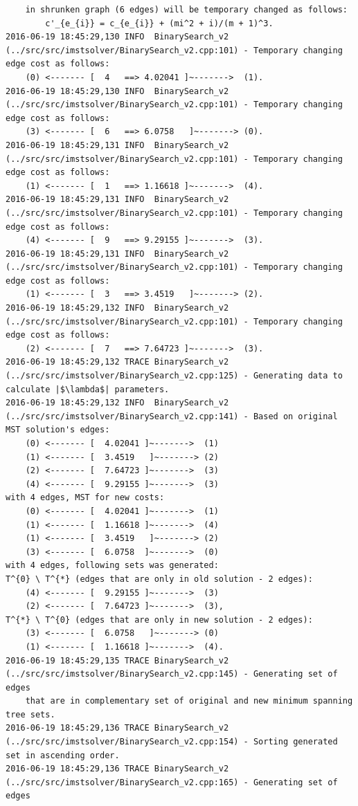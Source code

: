 \begin{verbatim}
	in shrunken graph (6 edges) will be temporary changed as follows:
		c'_{e_{i}} = c_{e_{i}} + (mi^2 + i)/(m + 1)^3.
2016-06-19 18:45:29,130 INFO  BinarySearch_v2 (../src/src/imstsolver/BinarySearch_v2.cpp:101) - Temporary changing edge cost as follows:
	(0)	<------- [	4	==>	4.02041	]~------->	(1).
2016-06-19 18:45:29,130 INFO  BinarySearch_v2 (../src/src/imstsolver/BinarySearch_v2.cpp:101) - Temporary changing edge cost as follows:
	(3)	<------- [	6	==>	6.0758	 ]~------->	(0).
2016-06-19 18:45:29,131 INFO  BinarySearch_v2 (../src/src/imstsolver/BinarySearch_v2.cpp:101) - Temporary changing edge cost as follows:
	(1)	<------- [	1	==>	1.16618	]~------->	(4).
2016-06-19 18:45:29,131 INFO  BinarySearch_v2 (../src/src/imstsolver/BinarySearch_v2.cpp:101) - Temporary changing edge cost as follows:
	(4)	<------- [	9	==>	9.29155	]~------->	(3).
2016-06-19 18:45:29,131 INFO  BinarySearch_v2 (../src/src/imstsolver/BinarySearch_v2.cpp:101) - Temporary changing edge cost as follows:
	(1)	<------- [	3	==>	3.4519	 ]~------->	(2).
2016-06-19 18:45:29,132 INFO  BinarySearch_v2 (../src/src/imstsolver/BinarySearch_v2.cpp:101) - Temporary changing edge cost as follows:
	(2)	<------- [	7	==>	7.64723	]~------->	(3).
2016-06-19 18:45:29,132 TRACE BinarySearch_v2 (../src/src/imstsolver/BinarySearch_v2.cpp:125) - Generating data to calculate |$\lambda$| parameters.
2016-06-19 18:45:29,132 INFO  BinarySearch_v2 (../src/src/imstsolver/BinarySearch_v2.cpp:141) - Based on original MST solution's edges:
	(0)	<------- [	4.02041	]~------->	(1)
	(1)	<------- [	3.4519	 ]~------->	(2)
	(2)	<------- [	7.64723	]~------->	(3)
	(4)	<------- [	9.29155	]~------->	(3)
with 4 edges, MST for new costs:
	(0)	<------- [	4.02041	]~------->	(1)
	(1)	<------- [	1.16618	]~------->	(4)
	(1)	<------- [	3.4519	 ]~------->	(2)
	(3)	<------- [	6.0758 	]~------->	(0)
with 4 edges, following sets was generated:
T^{0} \ T^{*} (edges that are only in old solution - 2 edges):
	(4)	<------- [	9.29155	]~------->	(3)
	(2)	<------- [	7.64723	]~------->	(3),
T^{*} \ T^{0} (edges that are only in new solution - 2 edges):
	(3)	<------- [	6.0758	 ]~------->	(0)
	(1)	<------- [	1.16618	]~------->	(4).
2016-06-19 18:45:29,135 TRACE BinarySearch_v2 (../src/src/imstsolver/BinarySearch_v2.cpp:145) - Generating set of edges 
	that are in complementary set of original and new minimum spanning tree sets.
2016-06-19 18:45:29,136 TRACE BinarySearch_v2 (../src/src/imstsolver/BinarySearch_v2.cpp:154) - Sorting generated set in ascending order.
2016-06-19 18:45:29,136 TRACE BinarySearch_v2 (../src/src/imstsolver/BinarySearch_v2.cpp:165) - Generating set of edges 

\end{verbatim}
